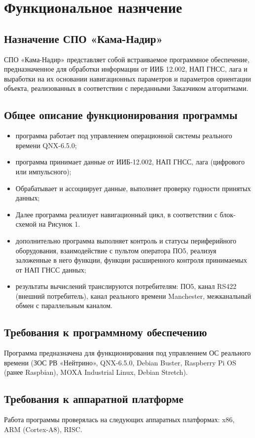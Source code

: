 \section{Функциональное назнчение} \label{purpose}
\subsection{Назначение СПО «Кама-Надир»}
СПО «Кама-Надир» представляет собой встраиваемое программное обеспечение, предназначенное для обработки информации от ИИБ 12.002, НАП ГНСС, 
лага и выработки на их основании навигационных параметров и параметров ориентации объекта, 
реализованных в соответствии с переданными Заказчиком алгоритмами.
\subsection{Общее описание функционирования программы}
\begin{itemize}
    \item программа работает под управлением операционной системы реального времени QNX-6.5.0;
    \item программа принимает данные от ИИБ-12.002, НАП ГНСС, лага (цифрового или импульсного);
    \item Обрабатывает и ассоциирует данные, выполняет проверку годности принятых данных;
    \item Далее программа реализует навигационный цикл, в соответствии с  блок-схемой на Рисунок 1.
    \item дополнительно программа выполняет контроль и статусы периферийного оборудования, взаимодействие с пультом оператора ПО5, 
    реализуя заложенные в него функции, функции расширенного контроля принимаемых от НАП ГНСС данных;
    \item результаты вычислений транслируются потребителям: ПО5, канал RS422 (внешний потребитель), 
    канал реального времени Manchester, межканальный обмен с параллельным каналом.
\end{itemize}
\subsection{Требования к программному обеспечению}
Программа предназначена для функционирования под управлением ОС реального времени (ЗОС РВ «Нейтрино», 
QNX-6.5.0, Debian Buster, Raspberry Pi OS (ранее Raspbian), 
MOXA Industrial Linux, Debian Stretch).
\subsection{Требования к аппаратной платформе}
Работа программы проверялась на следующих аппаратных платформах: x86, ARM (Cortex-A8), RISC.

